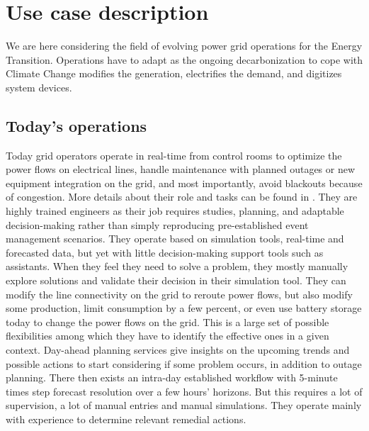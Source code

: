 \documentclass{IOS-Book-Article}
\begin{document}
\section{Use case description}
\label{sec:use_case_description}
We are here considering the field of evolving power grid operations for the Energy Transition. Operations have to adapt as the ongoing decarbonization to cope with Climate Change modifies the generation, electrifies the demand, and digitizes system devices. %

\subsection{Today's operations}

Today grid operators operate in real-time from control rooms to optimize the power flows on electrical lines, handle maintenance with planned outages or new equipment integration on the grid, and most importantly, avoid blackouts because of congestion. More details about their role and tasks can be found in \cite{prostejovsky2019future}. They are highly trained engineers as their job requires studies, planning, and adaptable decision-making rather than simply reproducing pre-established  event management scenarios. They operate based on simulation tools, real-time and forecasted data, but yet with little decision-making support tools such as assistants.  When they feel they need to solve a problem, they mostly manually explore solutions and validate their decision in their simulation tool. They can modify the line connectivity on the grid to reroute power flows, but also modify some production, limit consumption by a few percent, or even use battery storage today to change the power flows on the grid. This is a large set of possible flexibilities among which they have to identify the effective ones in a given context. Day-ahead planning services give insights on the upcoming trends and possible actions to start considering if some problem occurs, in addition to outage planning. There then exists an intra-day established workflow with 5-minute times step forecast resolution over a few hours' horizons.  But this requires a lot of supervision, a lot of manual entries and manual simulations. They operate mainly with experience to determine relevant remedial actions. 
\end{document}
